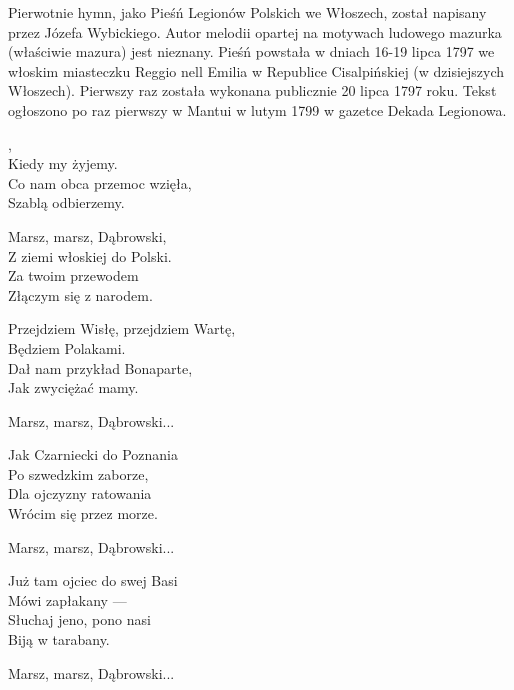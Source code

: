 \documentclass[12pt,a4paper,twoside]{songbook}
\begin{document}
\begin{info}Pierwotnie hymn, jako Pieśń Legionów Polskich we Włoszech, został napisany przez Józefa Wybickiego. Autor melodii opartej na motywach ludowego mazurka (właściwie mazura) jest nieznany. Pieśń powstała w dniach 16-19 lipca 1797 we włoskim miasteczku Reggio nell Emilia w Republice Cisalpińskiej (w dzisiejszych Włoszech). Pierwszy raz została wykonana publicznie 20 lipca 1797 roku. Tekst ogłoszono po raz pierwszy w Mantui w lutym 1799 w gazetce Dekada Legionowa.\end{info}

\begin{lyrics}[longestline={Przejdziem Wisłę, przejdziem Wartę,}]
,\\
Kiedy my żyjemy.\\
Co nam obca przemoc wzięła,\\
Szablą odbierzemy.

Marsz, marsz, Dąbrowski,\\
Z ziemi włoskiej do Polski.\\
Za twoim przewodem\\
Złączym się z narodem.

Przejdziem Wisłę, przejdziem Wartę,\\
Będziem Polakami.\\
Dał nam przykład Bonaparte,\\
Jak zwyciężać mamy.

Marsz, marsz, Dąbrowski...

Jak Czarniecki do Poznania\\
Po szwedzkim zaborze,\\
Dla ojczyzny ratowania\\
Wrócim się przez morze.

Marsz, marsz, Dąbrowski...

Już tam ojciec do swej Basi\\
Mówi zapłakany —\\
Słuchaj jeno, pono nasi\\
Biją w tarabany.

Marsz, marsz, Dąbrowski...
\end{lyrics}
\end{document}
